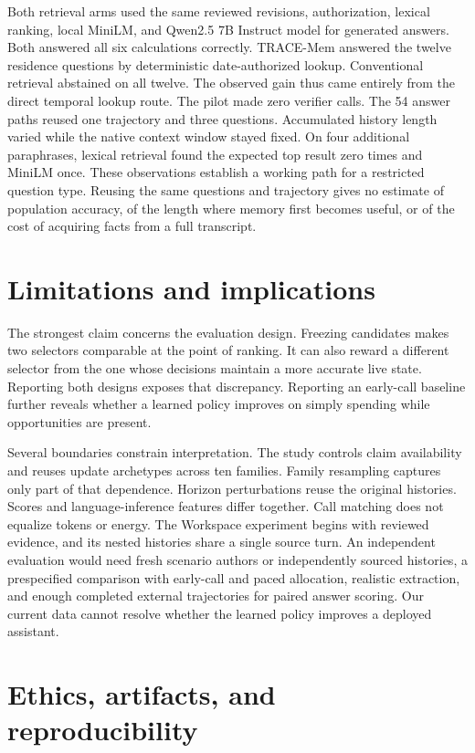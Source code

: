 \documentclass[
  11pt,
]{article}
\begin{document}
Both retrieval arms used the same reviewed revisions, authorization,
lexical ranking, local MiniLM, and Qwen2.5 7B Instruct model for
generated answers. Both answered all six calculations correctly.
TRACE-Mem answered the twelve residence questions by deterministic
date-authorized lookup. Conventional retrieval abstained on all twelve.
The observed gain thus came entirely from the direct temporal lookup
route. The pilot made zero verifier calls. The 54 answer paths reused
one trajectory and three questions. Accumulated history length varied
while the native context window stayed fixed. On four additional
paraphrases, lexical retrieval found the expected top result zero times
and MiniLM once. These observations establish a working path for a
restricted question type. Reusing the same questions and trajectory
gives no estimate of population accuracy, of the length where memory
first becomes useful, or of the cost of acquiring facts from a full
transcript.

\section{Limitations and
implications}\label{limitations-and-implications}

The strongest claim concerns the evaluation design. Freezing candidates
makes two selectors comparable at the point of ranking. It can also
reward a different selector from the one whose decisions maintain a more
accurate live state. Reporting both designs exposes that discrepancy.
Reporting an early-call baseline further reveals whether a learned
policy improves on simply spending while opportunities are present.

Several boundaries constrain interpretation. The study controls claim
availability and reuses update archetypes across ten families. Family
resampling captures only part of that dependence. Horizon perturbations
reuse the original histories. Scores and language-inference features
differ together. Call matching does not equalize tokens or energy. The
Workspace experiment begins with reviewed evidence, and its nested
histories share a single source turn. An independent evaluation would
need fresh scenario authors or independently sourced histories, a
prespecified comparison with early-call and paced allocation, realistic
extraction, and enough completed external trajectories for paired answer
scoring. Our current data cannot resolve whether the learned policy
improves a deployed assistant.

\section{Ethics, artifacts, and
reproducibility}\label{ethics-artifacts-and-reproducibility}
\end{document}
